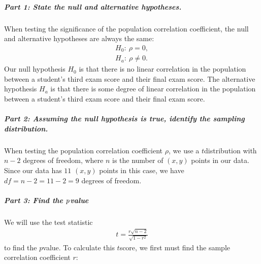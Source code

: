 \documentclass[letterpaper,10pt,english]{jupyterBook}
\begin{document}
\subparagraph{Part 1: State the null and alternative hypotheses.}
\label{\detokenize{Ch8 Correlation and Linear Regression/8.4 The Correlation Coefficient:part-1-state-the-null-and-alternative-hypotheses}}
\sphinxAtStartPar
When testing the significance of the population correlation coefficient, the null and alternative hypotheses are always the same:
\begin{align*}
H_0:\ \rho = 0, \\
H_a:\ \rho \neq 0.
\end{align*}
\sphinxAtStartPar
Our null hypothesis \(H_0\) is that there is no linear correlation in the population between a student’s third exam score and their final exam score. The alternative hypothesis \(H_a\) is that there is some degree of linear correlation in the population between a student’s third exam score and their final exam score.


\subparagraph{Part 2: Assuming the null hypothesis is true, identify the sampling distribution.}
\label{\detokenize{Ch8 Correlation and Linear Regression/8.4 The Correlation Coefficient:part-2-assuming-the-null-hypothesis-is-true-identify-the-sampling-distribution}}
\sphinxAtStartPar
When testing the population correlation coefficient \(\rho\), we use a \(t\)\sphinxhyphen{}distribution with \(n - 2\) degrees of freedom, where \(n\) is the number of \((x, y)\) points in our data. Since our data has \(11\) \((x, y)\) points in this case, we have \( df = n - 2 = 11 - 2 = 9\) degrees of freedom.


\subparagraph{Part 3: Find the \protect\(p\protect\)\sphinxhyphen{}value}
\label{\detokenize{Ch8 Correlation and Linear Regression/8.4 The Correlation Coefficient:part-3-find-the-p-value}}
\sphinxAtStartPar
We will use the test statistic
\begin{equation*}
\begin{split} t = \frac{r\sqrt{n-2}}{\sqrt{1 - r^2}} \end{split}
\end{equation*}
\sphinxAtStartPar
to find the \(p\)\sphinxhyphen{}value. To calculate this \(t\)\sphinxhyphen{}score, we first must find the sample correlation coefficient \(r\):
\end{document}
